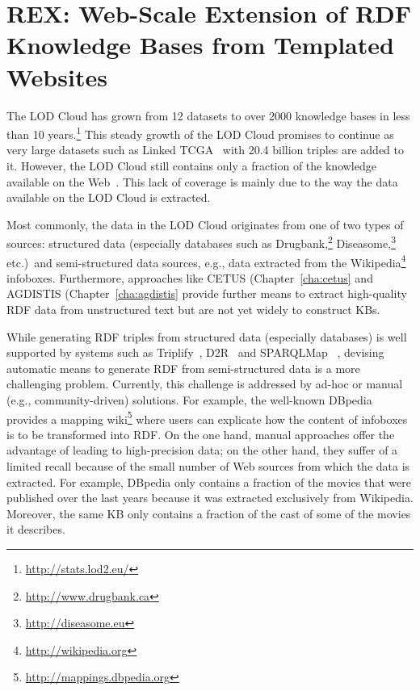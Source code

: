 \chapter[Extraction of RDF Knowledge from Templated Websites]{REX: Web-Scale Extension of RDF Knowledge Bases from Templated Websites}
\label{cha:rex}



The \ac{LOD} Cloud has grown from 12 datasets to over 2000 knowledge bases in less than 10 years.\footnote{\url{http://stats.lod2.eu/}}
This steady growth of the \ac{LOD} Cloud promises to continue as very large datasets such as  Linked TCGA~\cite{SAL+13a} with 20.4 billion triples are added to it. 
However, the \ac{LOD} Cloud still contains only a fraction of the knowledge available on the Web~\cite{GER+13}. 
This lack of coverage is mainly due to the way the data available on the \ac{LOD} Cloud is extracted. 

Most commonly, the data in the \ac{LOD} Cloud originates from one of two types of sources: structured data (especially databases such as Drugbank,\footnote{\url{http://www.drugbank.ca}} Diseasome,\footnote{\url{http://diseasome.eu}} etc.)~and semi-structured data sources, e.g., data extracted from the Wikipedia\footnote{\url{http://wikipedia.org}} infoboxes. 
Furthermore, approaches like CETUS (Chapter~\ref{cha:cetus} and  AGDISTIS (Chapter~\ref{cha:agdistis} provide further means to extract high-quality \ac{RDF} data from unstructured text but are not yet widely to construct \ac{KB}s.

While generating \ac{RDF} triples from structured data (especially databases) is well supported by systems such as Triplify~\cite{triplify_www}, D2R~\cite{Bizer04} and SPARQLMap~\cite{unbehauen-jist-2012-sparqlmap}
, devising automatic means to generate \ac{RDF} from semi-structured data is a more challenging  problem. 
Currently, this challenge is addressed by ad-hoc or manual (e.g., community-driven) solutions. 
For example, the well-known DBpedia~\cite{dbpedia-swj} provides a mapping wiki\footnote{\url{http://mappings.dbpedia.org}} where users can explicate how the content of infoboxes is to be transformed into \ac{RDF}. 
On the one hand, manual approaches offer the advantage of leading to high-precision data; on the other hand, they suffer of a limited recall because of the small number of Web sources from which the data is extracted. 
For example, DBpedia only contains a fraction of the movies that were published over the last years because it was extracted exclusively from Wikipedia.
Moreover, the same  \ac{KB} only contains a fraction of the cast of some of the movies it describes.

